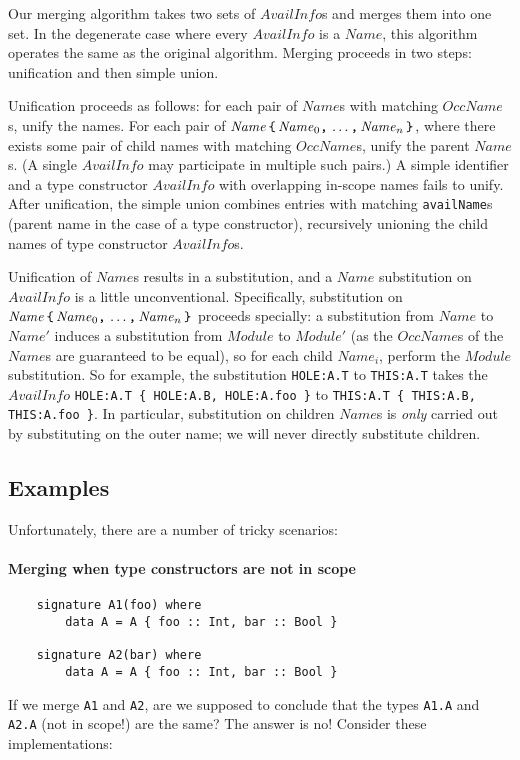 \documentclass{article}
\newcommand{\I}[1]{\ensuremath{\mathit{#1}}}
\begin{document}
Our merging algorithm takes two sets of \I{AvailInfo}s and merges them
into one set.  In the degenerate case where every \I{AvailInfo} is a
$Name$, this algorithm operates the same as the original algorithm.
Merging proceeds in two steps: unification and then simple union.

Unification proceeds as follows: for each pair of \I{Name}s with
matching \I{OccName}s, unify the names.  For each pair of $\I{Name}\, \verb|{|\,
\I{Name}_0\verb|,|\, \ldots\verb|,|\, \I{Name}_n\, \verb|}|$, where there
exists some pair of child names with matching \I{OccName}s, unify the
parent \I{Name}s.  (A single \I{AvailInfo} may participate in multiple such
pairs.)  A simple identifier and a type constructor \I{AvailInfo} with
overlapping in-scope names fails to unify.  After unification,
the simple union combines entries with matching \verb|availName|s (parent
name in the case of a type constructor), recursively unioning the child
names of type constructor \I{AvailInfo}s.

Unification of \I{Name}s results in a substitution, and a \I{Name} substitution
on \I{AvailInfo} is a little unconventional.  Specifically, substitution on $\I{Name}\, \verb|{|\,
\I{Name}_0\verb|,|\, \ldots\verb|,|\, \I{Name}_n\, \verb|}|$ proceeds specially:
a substitution from \I{Name} to $\I{Name}'$ induces a substitution from
\I{Module} to $Module'$ (as the \I{OccName}s of the \I{Name}s are guaranteed
to be equal), so for each child $\I{Name}_i$, perform the \I{Module}
substitution.  So for example, the substitution \verb|HOLE:A.T| to \verb|THIS:A.T|
takes the \I{AvailInfo} \verb|HOLE:A.T { HOLE:A.B, HOLE:A.foo }| to
\verb|THIS:A.T { THIS:A.B, THIS:A.foo }|.  In particular, substitution
on children \I{Name}s is \emph{only} carried out by substituting on the outer name;
we will never directly substitute children.

\subsection{Examples}

Unfortunately, there are a number of tricky scenarios:

\paragraph{Merging when type constructors are not in scope}

\begin{verbatim}
    signature A1(foo) where
        data A = A { foo :: Int, bar :: Bool }

    signature A2(bar) where
        data A = A { foo :: Int, bar :: Bool }
\end{verbatim}
%
If we merge \verb|A1| and \verb|A2|, are we supposed to conclude that
the types \verb|A1.A| and \verb|A2.A| (not in scope!) are the same?
The answer is no!  Consider these implementations:
\end{document}
